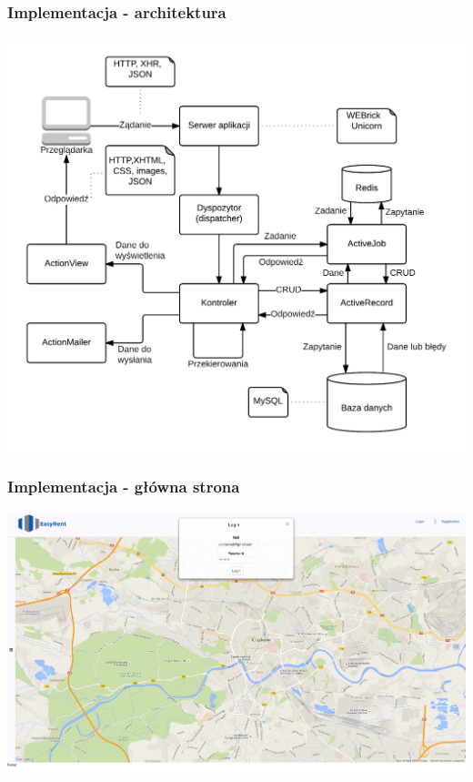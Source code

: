 \documentclass{beamer}
\begin{document}
\begin{frame}
\frametitle{Implementacja - architektura}
\centerline{\includegraphics[scale=0.5]{pictures/architecture.png}}
\end{frame}


\begin{frame}
\frametitle{Implementacja - główna strona}
\centerline{\includegraphics[scale=0.15]{pictures/before_login.png}}
\end{frame}

\end{document}
